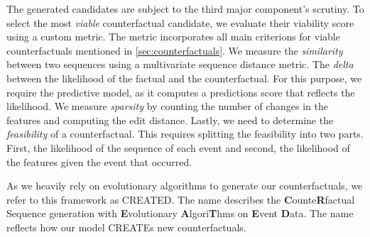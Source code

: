 \documentclass[./../../paper.tex]{subfiles}
\begin{document}
The generated candidates are subject to the third major component's scrutiny. 
To select the most \emph{viable} counterfactual candidate, we evaluate their viability score using a custom metric. 
The metric incorporates all main criterions for viable counterfactuals mentioned in \autoref{sec:counterfactuals}. 
We measure the \emph{similarity} between two sequences using a multivariate sequence distance metric. The \emph{delta} between the likelihood of the factual and the counterfactual. For this purpose, we require the predictive model, as it computes a predictions score that reflects the likelihood. 
We measure \emph{sparsity} by counting the number of changes in the features and computing the edit distance. Lastly, we need to determine the \emph{feasibility} of a counterfactual. This requires splitting the feasibility into two parts. First, the likelihood of the sequence of each event and second, the likelihood of the features given the event that occurred.

As we heavily rely on evolutionary algorithms to generate our counterfactuals, we refer to this framework as CREATED. The name describes the \textbf{C}ounte\textbf{R}factual Sequence generation with \textbf{E}volutionary \textbf{A}lgori\textbf{T}hms on \textbf{E}vent \textbf{D}ata. The name reflects how our model CREATEs new counterfactuals.
\end{document}

